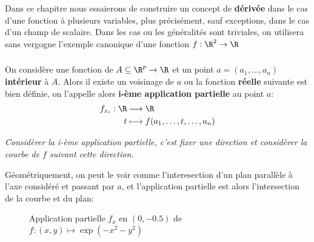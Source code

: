 \chapter*{}
Dans ce chapitre nous essaierons de construire un concept de \textbf{dérivée} dans le cas d'une fonction à plusieurs variables, plus précisément, sauf exceptions, dans le cas d'un champ de scalaire. Dans les cas ou les généralités sont triviales, on utilisera sans vergogne l'exemple canonique d'une fonction \(f : \R^2 \rightarrow \R\)

\subsection*{}
On considère une fonction de \(A \subseteq \R^p \rightarrow \R\) et un point \(a = (a_1, \ldots, a_n)\) \textbf{intérieur} à \(A\). Alors il existe un voisinage de \(a\) ou la fonction \textbf{réelle} suivante est bien définie, on l'appelle alors \textbf{i-ème application partielle} au point \(a\):
\[
   \begin{aligned}
      f_{x_i} : \R &\longrightarrow \R\\
      t &\longmapsto f(a_1, \ldots, t, \ldots, a_n)
   \end{aligned}
\]
\begin{center}
   \textit{Considèrer la i-ème application partielle, c'est fixer une direction et considèrer la courbe de \(f\) suivant cette direction.}
\end{center}
Géométriquement, on peut le voir comme l'interesection d'un plan parallèle à l'axe considéré et passant par \(a\), et l'application partielle est alors l'intersection de la courbe et du plan:
\begin{figure}[h]
   \centering
   \captionsetup{labelformat=empty}
   \caption{Application partielle \(f_x\) en \((0, -0.5)\) de \(f : (x, y) \mapsto \exp(-x^2 - y^2)\)}
\end{figure}
